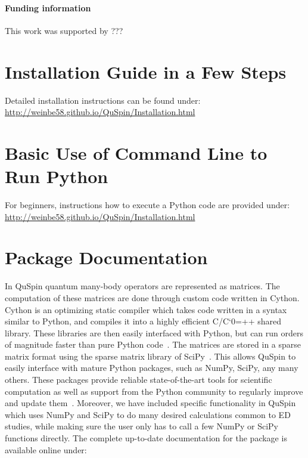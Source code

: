 \documentclass{SciPost}
\newcommand\0{\scalebox{-1}[1]{0}}
\let\svttfamily\ttfamily
\renewcommand\ttfamily{\svttfamily\catcode`0=\active }
\renewcommand\texttt{\bgroup\ttfamily\texttthelp}
\def\texttthelp#1{#1\egroup}
\begin{document}
\paragraph{Funding information}
This work was supported by ???
\begin{appendix}
	
\section{Installation Guide in a Few Steps}
\label{app:install}
	
Detailed installation instructions can be found under:\\
	
\href{http://weinbe58.github.io/QuSpin/Installation.html}{http://weinbe58.github.io/QuSpin/Installation.html}\\
	
	
	
\section{Basic Use of Command Line to Run Python}
\label{app:cmd_line}

For beginners, instructions how to execute a Python code are provided under:\\

\href{http://weinbe58.github.io/QuSpin/Installation.html}{http://weinbe58.github.io/QuSpin/Installation.html}\\
	
\section{Package Documentation}
\label{app:doc}
In QuSpin quantum many-body operators are represented as matrices. The computation of these matrices are done through custom code written in Cython. Cython is an optimizing static compiler which takes code written in a syntax similar to Python, and compiles it into a highly efficient C/C\texttt{++} shared library. These libraries are then easily interfaced with Python, but can run orders of magnitude faster than pure Python code~\cite{Cython}. The matrices are stored in a sparse matrix format using the sparse matrix library of SciPy~\cite{SciPy_package}. This allows QuSpin to easily interface with mature Python packages, such as NumPy, SciPy, any many others. These packages provide reliable state-of-the-art tools for scientific computation as well as support from the Python community to regularly improve and update them~\cite{NumPy,Python_computing_1,Python_computing_2,SciPy_package}. Moreover, we have included specific functionality in QuSpin which uses NumPy and SciPy to do many desired calculations common to ED studies, while making sure the user only has to call a few NumPy or SciPy functions directly. The complete up-to-date documentation for the package is available online under:\\
	

\end{appendix}
\end{document}
